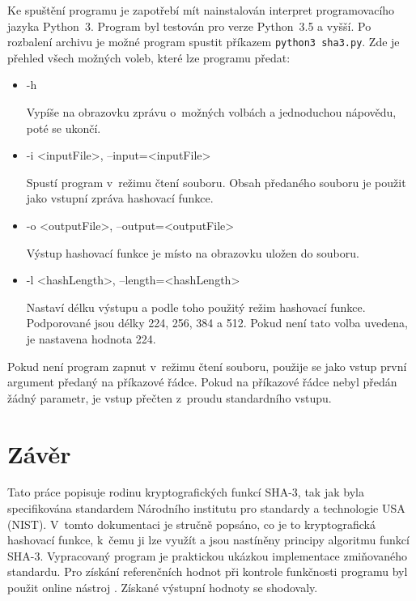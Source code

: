 \documentclass[titlepage,a4paper,12pt]{article}
\begin{document}
Ke spuštění programu je zapotřebí mít nainstalován interpret programovacího jazyka Python~3. Program byl testován pro verze Python~3.5 a vyšší. Po rozbalení archivu je možné program spustit příkazem \texttt{python3 sha3.py}. Zde je přehled všech možných voleb, které lze programu předat:

\begin{itemize}
    \item -h \par
    Vypíše na obrazovku zprávu o~možných volbách a jednoduchou nápovědu, poté se ukončí.
    \item -i <inputFile>, --input=<inputFile> \par
    Spustí program v~režimu čtení souboru. Obsah předaného souboru je použit jako vstupní zpráva hashovací funkce.
    \item -o <outputFile>, --output=<outputFile> \par
    Výstup hashovací funkce je místo na obrazovku uložen do souboru.
     \item -l <hashLength>, --length=<hashLength> \par
    Nastaví délku výstupu a podle toho použitý režim hashovací funkce. Podporované jsou délky 224, 256, 384 a 512. Pokud není tato volba uvedena, je nastavena hodnota 224.
\end{itemize}

Pokud není program zapnut v~režimu čtení souboru, použije se jako vstup první argument předaný na příkazové řádce. Pokud na příkazové řádce nebyl předán žádný parametr, je vstup přečten z~proudu standardního vstupu.

\section{Závěr}

Tato práce popisuje rodinu kryptografických funkcí SHA-3, tak jak byla specifikována standardem \cite{dworkin2015sha} Národního institutu pro standardy a technologie USA (NIST). V~tomto dokumentaci je stručně popsáno, co je to kryptografická hashovací funkce, k~čemu ji lze využít a jsou nastíněny principy algoritmu funkcí SHA-3. Vypracovaný program je praktickou ukázkou implementace zmiňovaného standardu. Pro získání referenčních hodnot při kontrole funkčnosti programu byl použit online nástroj \cite{tool}. Získané výstupní hodnoty se shodovaly.


 
\end{document}
